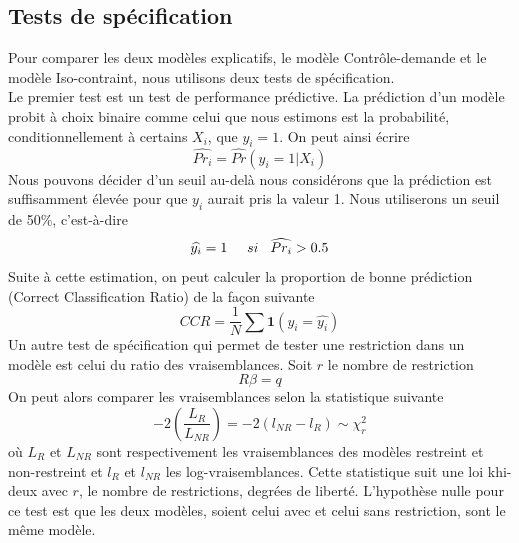 \documentclass[a4paper, oneside, titlepage]{article}
\begin{document}
\subsection{Tests de spécification}
Pour comparer les deux modèles explicatifs, le modèle Contrôle-demande et le modèle Iso-contraint, nous utilisons deux tests de spécification.
\\
Le premier test est un test de performance prédictive. La prédiction d'un modèle probit à choix binaire comme celui que nous estimons est la probabilité, conditionnellement à certains $X_i$, que $y_i=1$. On peut ainsi écrire
\[\widehat{Pr_i}=\widehat{Pr}(y_i=1|X_i)\]
Nous pouvons décider d'un seuil au-delà nous considérons que la prédiction est suffisamment élevée pour que $y_i$ aurait pris la valeur 1. Nous utiliserons un seuil de 50\%, c'est-à-dire
\[\widehat{y_i}=1\hspace{0,5cm} si\hspace{0,3cm} \widehat{Pr_i}>0.5\]
Suite à cette estimation, on peut calculer la proportion de bonne prédiction (Correct Classification Ratio) de la façon suivante
\[CCR=\frac{1}{N}\sum \mathbf{1} (y_i=\widehat{y_i}) \]
Un autre test de spécification qui permet de tester une restriction dans un modèle est celui du ratio des vraisemblances. Soit $r$ le nombre de restriction
\[R\beta=q\]
On peut alors comparer les vraisemblances selon la statistique suivante
\[-2\left(\frac{L_R}{L_{NR}}\right)=-2(l_{NR}-l_R) \sim \chi_r^2\]
où $L_R$ et $L_{NR}$ sont respectivement les vraisemblances des modèles restreint et non-restreint et $l_R$ et $l_{NR}$ les log-vraisemblances. Cette statistique suit une loi khi-deux avec $r$, le nombre de restrictions, degrées de liberté. L'hypothèse nulle pour ce test est que les deux modèles, soient celui avec et celui sans restriction, sont le même modèle.
\end{document}
